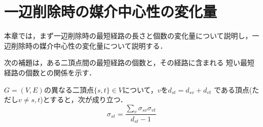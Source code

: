 \chapter{一辺削除時の媒介中心性の変化量}
本章では，まず一辺削除時の最短経路の長さと個数の変化量について説明し，一辺削除時の媒介中心性の変化量について説明する．

次の補題は，ある二頂点間の最短経路の個数と，その経路に含まれる
短い最短経路の個数との関係を示す．
\begin{lemma}
  \label{lemma:number-of-paths}
  $G=(V,E)$の異なる二頂点$\{s,t\}\in V$について，$v$を$d_{st}=d_{sv}+d_{vt}$
  である頂点(ただし$v\neq s,t$)とすると，次が成り立つ．
  \begin{equation}
    \label{eq:number-of-paths}
    \sigma_{st}=\frac{\sum_{v}\sigma_{sv}\sigma_{vt}}{d_{st}-1}
  \end{equation}
\end{lemma}
